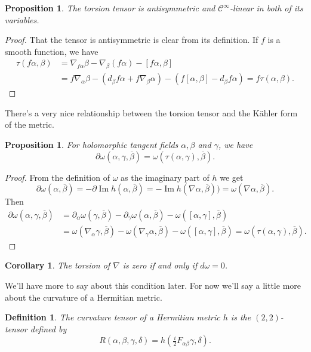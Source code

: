 \documentclass[10pt,a4paper]{article}
\newtheorem{prop}[theo]{Proposition}
\newtheorem{coro}[theo]{Corollary}
\newtheorem{defi}[theo]{Definition}
\newtheorem*{proof}{Proof}
\newcommand{\cc}[1]{\mathcal{#1}}
\def\qedhere{}
\def\ov#1{\overline{#1}}
\DeclareMathOperator{\im}{Im}
\begin{document}
\begin{prop}
The torsion tensor is antisymmetric and $\cc C^\infty$-linear in both of its variables.
\end{prop}

\begin{proof}
That the tensor is antisymmetric is clear from its definition. If $f$ is a smooth function, we have
\begin{align*}
\tau(f\alpha,\beta)
&= \nabla_{f\alpha}\beta - \nabla_\beta(f\alpha) - [f\alpha,\beta]
\\
&= f\nabla_\alpha \beta - (d_\beta f \alpha + f \nabla_\beta \alpha) - (f[\alpha,\beta] - d_\beta f \alpha)
= f \tau(\alpha,\beta).
\qedhere
\end{align*}
\end{proof}

There's a very nice relationship between the torsion tensor and the K\"ahler form of the metric.

\begin{prop}
For holomorphic tangent fields $\alpha, \beta$ and $\gamma$, we have
\[
\partial\omega(\alpha,\gamma,\ov\beta)
= \omega(\tau(\alpha,\gamma), \ov\beta).
\]
\end{prop}

\begin{proof}
From the definition of $\omega$ as the imaginary part of $h$ we get
\[
\partial\omega(\alpha,\ov\beta)
= -\partial\im h(\alpha, \ov\beta)
= -\im h(\nabla\alpha,\ov\beta))
= \omega(\nabla\alpha,\ov\beta).
\]
Then
\begin{align*}
\partial\omega(\alpha,\gamma,\ov\beta)
&= \partial_\alpha\omega(\gamma,\ov\beta)
- \partial_\gamma\omega(\alpha,\ov\beta)
- \omega([\alpha,\gamma], \ov\beta)
\\
&= \omega(\nabla_\alpha\gamma, \ov\beta)
- \omega(\nabla_\gamma\alpha, \ov\beta)
- \omega([\alpha,\gamma], \ov\beta)
= \omega(\tau(\alpha,\gamma), \ov\beta).
\end{align*}
\end{proof}

\begin{coro}
\label{coro:kahler-zero-torsion}
The torsion of $\nabla$ is zero if and only if $d\omega = 0$.
\end{coro}


We'll have more to say about this condition later. For now we'll say a little more about the curvature of a Hermitian metric.


\begin{defi}
The \emph{curvature tensor} of a Hermitian metric $h$ is the $(2,2)$-tensor defined by
$$
R(\alpha,\beta,\gamma,\delta)
= h(\tfrac i2 F_{\alpha\beta}\gamma, \delta).
$$
\end{defi}
\end{document}

